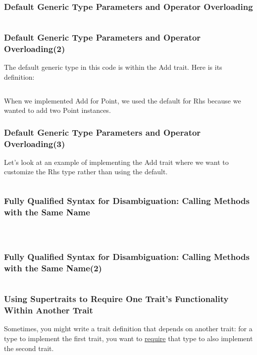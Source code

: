 \documentclass{beamer}
\begin{document}
\begin{frame}[fragile]
	\frametitle{Default Generic Type Parameters and Operator Overloading}
	\inputminted[fontsize=\fontsize{8.5pt}{8.5pt}]{rust}{./code/iter3.rs}
\end{frame}


\begin{frame}[fragile]
	\frametitle{Default Generic Type Parameters and Operator Overloading(2)}
	The default generic type in this code is within the Add trait. Here is its definition:
	
	\inputminted{rust}{./code/iter4.rs}
	
	When we implemented Add for Point, we used the default for Rhs because we wanted to add two Point instances. 
\end{frame}

\begin{frame}[fragile]
	\frametitle{Default Generic Type Parameters and Operator Overloading(3)}
	Let’s look at an example of implementing the Add trait where we want to customize the Rhs type rather than using the default.
	
	\inputminted{rust}{./code/iter5.rs}
\end{frame}


\begin{frame}[fragile]
	\frametitle{Fully Qualified Syntax for Disambiguation: Calling Methods with the Same Name}
	\begin{columns}
		\inputminted[fontsize=\tiny]{rust}{./code/iter6.rs}
		\inputminted[fontsize=\tiny]{rust}{./code/iter7.rs}
	\end{columns}
\end{frame}


\begin{frame}[fragile]
	\frametitle{Fully Qualified Syntax for Disambiguation: Calling Methods with the Same Name(2)}
	\inputminted[fontsize=\fontsize{8.5pt}{8.5pt}]{rust}{./code/iter8.rs}
\end{frame}


\begin{frame}[fragile]
	\frametitle{Using Supertraits to Require One Trait’s Functionality Within Another Trait}
	Sometimes, you might write a trait definition that depends on another trait: for a type to implement the first trait, you want to \underline{require} that type to also implement the second trait. 
	
	\inputminted[fontsize=\fontsize{8.5pt}{8.5pt}]{rust}{./code/iter9.rs}
	
\end{frame}
\end{document}
